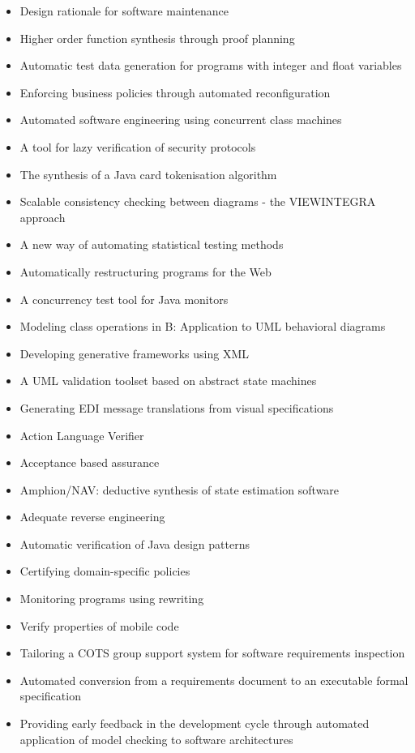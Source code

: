 {\small
\begin{itemize}[itemsep=-1ex]
  \item Design rationale for software maintenance
  \item Higher order function synthesis through proof planning
  \item Automatic test data generation for programs with integer and float variables
  \item Enforcing business policies through automated reconfiguration
  \item Automated software engineering using concurrent class machines
  \item A tool for lazy verification of security protocols
  \item The synthesis of a Java card tokenisation algorithm
  \item Scalable consistency checking between diagrams - the VIEWINTEGRA approach
  \item A new way of automating statistical testing methods
  \item Automatically restructuring programs for the Web
  \item A concurrency test tool for Java monitors
  \item Modeling class operations in B: Application to UML behavioral diagrams
  \item Developing generative frameworks using XML
  \item A UML validation toolset based on abstract state machines
  \item Generating EDI message translations from visual specifications
  \item Action Language Verifier
  \item Acceptance based assurance
  \item Amphion/NAV: deductive synthesis of state estimation software
  \item Adequate reverse engineering
  \item Automatic verification of Java design patterns
  \item Certifying domain-specific policies
  \item Monitoring programs using rewriting
  \item Verify properties of mobile code
  \item Tailoring a COTS group support system for software requirements inspection
  \item Automated conversion from a requirements document to an executable formal specification
  \item Providing early feedback in the development cycle through automated application of model checking to software architectures

\end{itemize}}
